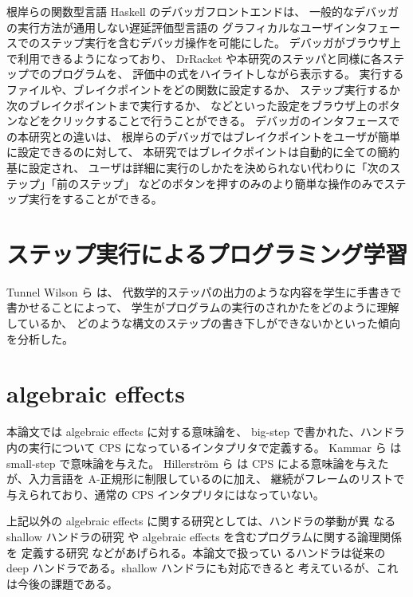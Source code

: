 根岸ら\cite{NI2009}の関数型言語 Haskell のデバッガフロントエンドは、
一般的なデバッガの実行方法が通用しない遅延評価型言語の
グラフィカルなユーザインタフェースでのステップ実行を含むデバッガ操作を可能にした。
デバッガがブラウザ上で利用できるようになっており、
DrRacket や本研究のステッパと同様に各ステップでのプログラムを、
評価中の式をハイライトしながら表示する。
実行するファイルや、ブレイクポイントをどの関数に設定するか、
ステップ実行するか次のブレイクポイントまで実行するか、
などといった設定をブラウザ上のボタンなどをクリックすることで行うことができる。
デバッガのインタフェースでの本研究との違いは、
根岸ら\cite{NI2009}のデバッガではブレイクポイントをユーザが簡単に設定できるのに対して、
本研究ではブレイクポイントは自動的に全ての簡約基に設定され、
ユーザは詳細に実行のしかたを決められない代わりに「次のステップ」「前のステップ」
などのボタンを押すのみのより簡単な操作のみでステップ実行をすることができる。

\section{ステップ実行によるプログラミング学習}

Tunnel Wilson ら \cite{tunnell18} は、
代数学的ステッパの出力のような内容を学生に手書きで書かせることによって、
学生がプログラムの実行のされかたをどのように理解しているか、
どのような構文のステップの書き下しができないかといった傾向を分析した。

\section{algebraic effects}
\label{section:algebraic effects__related}

本論文では algebraic effects に対する意味論を、
big-step で書かれた、ハンドラ内の実行について CPS になっているインタプリタで定義する。
Kammar ら \cite{10.1145/2500365.2500590} は small-step で意味論を与えた。
Hillerstr{\"o}m ら \cite{e6cb0c3222794e48bf38cf44e46fe4aa} は
CPS による意味論を与えたが、入力言語を A-正規形に制限しているのに加え、
継続がフレームのリストで与えられており、通常の CPS インタプリタにはなっていない。

上記以外の algebraic effects に関する研究としては、ハンドラの挙動が異
なる shallow ハンドラの研究 \cite{10.1007/978-3-030-02768-1_22} や
algebraic effects を含むプログラムに関する論理関係を
定義する研究 \cite{10.1145/3158096} などがあげられる。本論文で扱ってい
るハンドラは従来の deep ハンドラである。shallow ハンドラにも対応できると
考えているが、これは今後の課題である。
